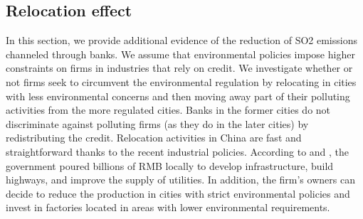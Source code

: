 \documentclass[12pt]{article}
\begin{document}
\subsection{Relocation effect}

In this section, we provide additional evidence of the reduction of SO2 emissions channeled through banks. We assume that environmental policies impose higher constraints on firms in industries that rely on credit. We investigate whether or not firms seek to circumvent the environmental regulation by relocating in cities with less environmental concerns and then moving away part of their polluting activities from the more regulated cities. Banks in the former cities do not discriminate against polluting firms (as they do in the later cities) by redistributing the credit. Relocation activities in China are fast and straightforward thanks to the recent industrial policies. According to \cite{Wang2013-tb} and \cite{Alder2016-rl}, the government poured billions of RMB locally to develop infrastructure, build highways, and improve the supply of utilities. In addition, the firm’s owners can decide to reduce the production in cities with strict environmental policies and invest in factories located in areas with lower environmental requirements.
\end{document}
